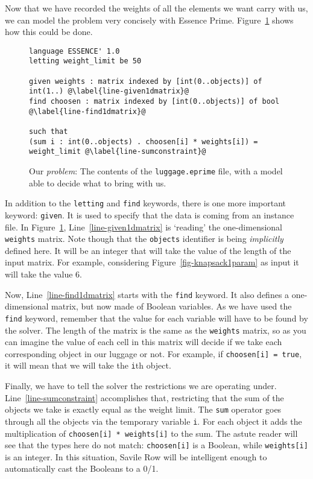 Now that we have recorded the weights of all the elements we want carry with us,
we can model the problem very concisely with Essence Prime. Figure~\ref{fig-knapsack1}
shows how this could be done.
\begin{figure}
\begin{lstlisting}
language ESSENCE' 1.0
letting weight_limit be 50

given weights : matrix indexed by [int(0..objects)] of int(1..) @\label{line-given1dmatrix}@
find choosen : matrix indexed by [int(0..objects)] of bool @\label{line-find1dmatrix}@

such that
(sum i : int(0..objects) . choosen[i] * weights[i]) = weight_limit @\label{line-sumconstraint}@
\end{lstlisting}
    \caption{Our \emph{problem}: The contents of the \texttt{luggage.eprime}
    file, with a model able to decide what to bring with us.}
\label{fig-knapsack1}
\end{figure}
In addition to the \texttt{letting} and \texttt{find} keywords, there is one
more important keyword: \texttt{given}. It is used to specify that the data is
coming from an instance file. In Figure~\ref{fig-knapsack1},
Line~\ref{line-given1dmatrix} is `reading' the one-dimensional \texttt{weights}
matrix.  Note though that the \texttt{objects} identifier is being
\emph{implicitly} defined here. It will be an integer that will take the value
of the length of the input matrix. For example, considering
Figure~\ref{fig-knapsack1param} as input it will take the value 6.

Now, Line~\ref{line-find1dmatrix} starts with the \texttt{find} keyword. 
It also defines a one-dimensional matrix, but now made of Boolean variables. As
we have used the \texttt{find} keyword, remember that the value for each
variable will have to be found by the solver.  The length of the matrix is the
same as the \texttt{weights} matrix, so as you can imagine the value of each
cell in this matrix will decide if we take each corresponding object in our
luggage or not.  For example, if \texttt{choosen[i] = true}, it will mean that
we will take the \texttt{i}th object.

Finally, we have to tell the solver the restrictions we are operating under.
Line~\ref{line-sumconstraint} accomplishes that, restricting that the sum of
the objects we take is exactly equal as the weight limit.
The \texttt{sum} operator goes through all the objects via the temporary
variable \texttt{i}. For each object it adds the multiplication of
\texttt{choosen[i] * weights[i]} to the sum. The astute reader will see that
the types here do not match: \texttt{choosen[i]} is a Boolean, while
\texttt{weights[i]} is an integer. In this situation, Savile Row will be
intelligent enough to automatically cast the Booleans to a 0/1.

